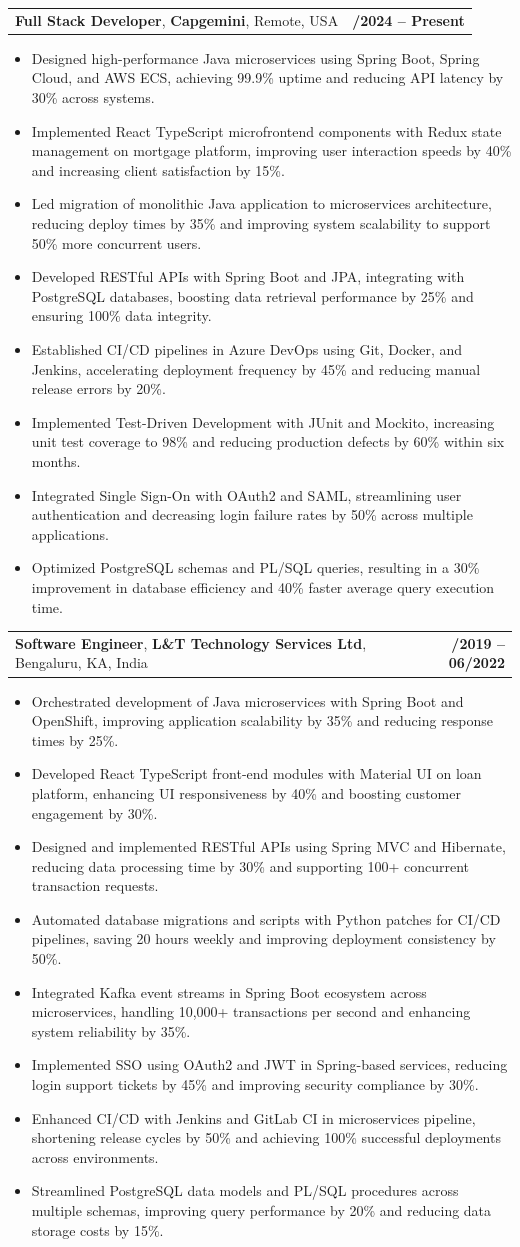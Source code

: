\documentclass[letterpaper,11pt]{article}
\makeatletter
\newcommand{\resumeItem}[1]{
  \item\footnotesize{
    {#1 \vspace{-2pt}}
  }
}
\newcommand{\resumeSubheading}[4]{
  \vspace{-2pt}\item
    \begin{tabular*}{1.0\textwidth}[t]{l@{\extracolsep{\fill}}r}
      \textbf{\fontsize{10pt}{14pt}\selectfont #3}, \textbf{\fontsize{10pt}{14pt}\selectfont #1}, \fontsize{10pt}{14pt}\selectfont #4 & \textbf{\fontsize{10pt}{14pt}\selectfont #2} \\
    \end{tabular*}\vspace{-7pt}
}
\newcommand{\resumeItemListStart}{\begin{itemize}[leftmargin=*]}
\newcommand{\resumeItemListEnd}{\end{itemize}\vspace{-5pt}}
\makeatother
\begin{document}
    \resumeSubheading
        {Capgemini}{01/2024 -- Present}
        {Full Stack Developer}{Remote, USA}
      \resumeItemListStart
        \resumeItem{Designed high-performance Java microservices using Spring Boot, Spring Cloud, and AWS ECS, achieving 99.9\% uptime and reducing API latency by 30\% across systems.}
        \resumeItem{Implemented React TypeScript microfrontend components with Redux state management on mortgage platform, improving user interaction speeds by 40\% and increasing client satisfaction by 15\%.}
        \resumeItem{Led migration of monolithic Java application to microservices architecture, reducing deploy times by 35\% and improving system scalability to support 50\% more concurrent users.}
        \resumeItem{Developed RESTful APIs with Spring Boot and JPA, integrating with PostgreSQL databases, boosting data retrieval performance by 25\% and ensuring 100\% data integrity.}
        \resumeItem{Established CI/CD pipelines in Azure DevOps using Git, Docker, and Jenkins, accelerating deployment frequency by 45\% and reducing manual release errors by 20\%.}
        \resumeItem{Implemented Test-Driven Development with JUnit and Mockito, increasing unit test coverage to 98\% and reducing production defects by 60\% within six months.}
        \resumeItem{Integrated Single Sign-On with OAuth2 and SAML, streamlining user authentication and decreasing login failure rates by 50\% across multiple applications.}
        \resumeItem{Optimized PostgreSQL schemas and PL/SQL queries, resulting in a 30\% improvement in database efficiency and 40\% faster average query execution time.}
      \resumeItemListEnd

    \resumeSubheading
        {L\&T Technology Services Ltd}{08/2019 -- 06/2022}
        {Software Engineer}{Bengaluru, KA, India}
      \resumeItemListStart
        \resumeItem{Orchestrated development of Java microservices with Spring Boot and OpenShift, improving application scalability by 35\% and reducing response times by 25\%.}
        \resumeItem{Developed React TypeScript front-end modules with Material UI on loan platform, enhancing UI responsiveness by 40\% and boosting customer engagement by 30\%.}
        \resumeItem{Designed and implemented RESTful APIs using Spring MVC and Hibernate, reducing data processing time by 30\% and supporting 100+ concurrent transaction requests.}
        \resumeItem{Automated database migrations and scripts with Python patches for CI/CD pipelines, saving 20 hours weekly and improving deployment consistency by 50\%.}
        \resumeItem{Integrated Kafka event streams in Spring Boot ecosystem across microservices, handling 10,000+ transactions per second and enhancing system reliability by 35\%.}
        \resumeItem{Implemented SSO using OAuth2 and JWT in Spring-based services, reducing login support tickets by 45\% and improving security compliance by 30\%.}
        \resumeItem{Enhanced CI/CD with Jenkins and GitLab CI in microservices pipeline, shortening release cycles by 50\% and achieving 100\% successful deployments across environments.}
        \resumeItem{Streamlined PostgreSQL data models and PL/SQL procedures across multiple schemas, improving query performance by 20\% and reducing data storage costs by 15\%.}
      \resumeItemListEnd
\end{document}
